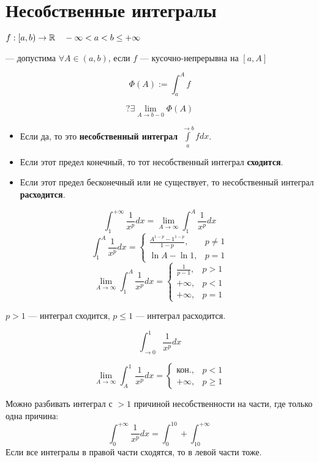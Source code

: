 

\cfoot{}



\section*{Несобственные интегралы}

\begin{definition}
    $f : [a, b) \to \mathbb{R} \quad -\infty<a<b\leq+\infty$

    --- допустима $\forall A\in (a, b)$, если $f$ --- кусочно-непрерывна на $[a, A]$
    
    $$\Phi(A):=\int_a^A f$$

    $$?\exists\lim\limits_{A\to b-0} \Phi(A)$$
    
    \begin{itemize}
        \item Если да, то это \textbf{несобственный интеграл} $\int\limits_{a}^{\rightarrow b} fdx$.
        \item Если этот предел конечный, то тот несобственный интеграл \textbf{сходится}.
        \item Если этот предел бесконечный или не существует, то несобственный интеграл \textbf{расходится}.
    \end{itemize}
\end{definition}

\begin{example}
    $$\int_1^{+\infty} \frac{1}{x^p} dx=\lim_{A\to\infty}\int_1^{A} \frac{1}{x^p} dx$$
    $$\int_1^{A} \frac{1}{x^p} dx=\begin{cases}
        \frac{A^{1-p}-1^{1-p}}{1-p}, & p\not=1 \\
        \ln A - \ln 1, & p=1
    \end{cases}$$
    $$\lim_{A\to\infty}\int_1^{A} \frac{1}{x^p} dx=\begin{cases}
        \frac{1}{p-1}, & p>1 \\
        +\infty, & p<1 \\
        +\infty, & p=1
    \end{cases}$$

    $p>1$ --- интеграл сходится, $p\leq 1$ --- интеграл расходится.
\end{example}

\begin{example}
    $$\int_{\rightarrow 0}^{1} \frac{1}{x^p}dx$$

    $$\lim_{A\to\infty} \int_A^1 \frac{1}{x^p}dx = \begin{cases}
        \text{кон}., & p<1 \\
        +\infty, & p\geq 1
    \end{cases}$$

    Можно разбивать интеграл с $>1$ причиной несобственности на части, где только одна причина:
    $$\int_0^{+\infty} \frac{1}{x^p}dx = \int_0^{10} + \int_{10}^{+\infty}$$
    Если все интегралы в правой части сходятся, то в левой части тоже.
\end{example}

